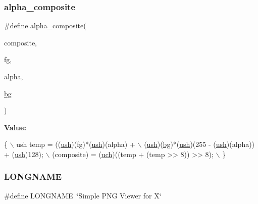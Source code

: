 \subsubsection{\texorpdfstring{alpha\+\_\+composite}{alpha\_composite}}
{\footnotesize\ttfamily \#define alpha\+\_\+composite(\begin{DoxyParamCaption}\item[{}]{composite,  }\item[{}]{fg,  }\item[{}]{alpha,  }\item[{}]{\mbox{\hyperlink{rpng2-x_8c_a808fa6d3573a86afa3ba7698a65b1ef6}{bg}} }\end{DoxyParamCaption})}

{\bfseries Value\+:}
\begin{DoxyCode}
\{               \(\backslash\)
    ush temp = ((\mbox{\hyperlink{readpng_8h_a3754180d606d4ed15468d15d9665aa2e}{ush}})(fg)*(\mbox{\hyperlink{readpng_8h_a3754180d606d4ed15468d15d9665aa2e}{ush}})(alpha) +                          \(\backslash\)
                (\mbox{\hyperlink{readpng_8h_a3754180d606d4ed15468d15d9665aa2e}{ush}})(\mbox{\hyperlink{rpng2-win_8c_a808fa6d3573a86afa3ba7698a65b1ef6}{bg}})*(\mbox{\hyperlink{readpng_8h_a3754180d606d4ed15468d15d9665aa2e}{ush}})(255 - (\mbox{\hyperlink{readpng_8h_a3754180d606d4ed15468d15d9665aa2e}{ush}})(alpha)) + (\mbox{\hyperlink{readpng_8h_a3754180d606d4ed15468d15d9665aa2e}{ush}})128);  \(\backslash\)
    (composite) = (\mbox{\hyperlink{readpng_8h_af3307af5922c72924a837559c801a8a4}{uch}})((temp + (temp >> 8)) >> 8);               \(\backslash\)
\}
\end{DoxyCode}
\mbox{\label{rpng-x_8c_ae8176192ea4d52bb0acbcfeaaffb3bd8}} 
\subsubsection{\texorpdfstring{L\+O\+N\+G\+N\+A\+ME}{LONGNAME}}
{\footnotesize\ttfamily \#define L\+O\+N\+G\+N\+A\+ME~\char`\"{}Simple P\+NG Viewer for X\char`\"{}}

\mbox{\label{rpng-x_8c_a17b2fe83e2965ffad1ae90c4283b3034}} 
